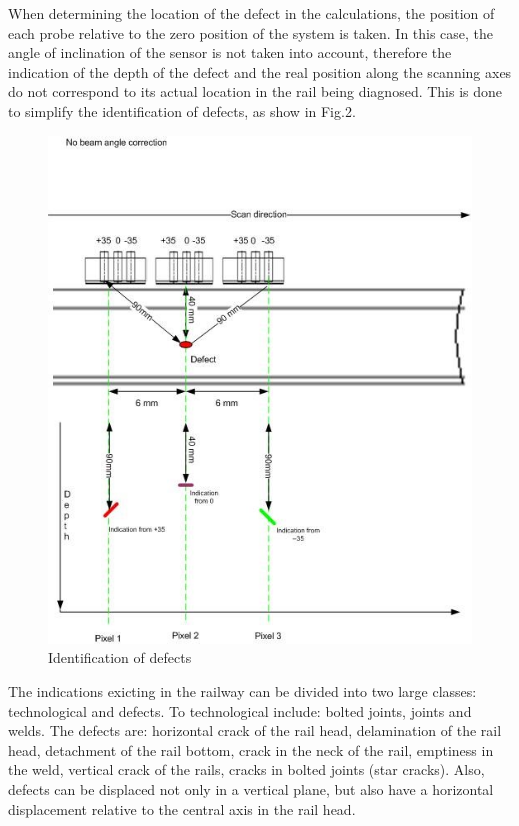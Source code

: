 \documentclass[a4paper, 12pt]{article}
\begin{document}
When determining the location of the defect in the calculations, the position of each probe relative to the zero position of the system is taken. In this case, the angle of inclination of the sensor is not taken into account, therefore the indication of the depth of the defect and the real position along the scanning axes do not correspond to its actual location in the rail being diagnosed. This is done to simplify the identification of defects, as show in Fig.2.

\begin{figure}[h!]
	\includegraphics[width=\textwidth]{fig2}
	\caption{Identification of defects}
\end{figure}

The indications exicting in the railway can be divided into two large classes: technological and defects. To technological include: bolted joints, joints and welds. The defects are: horizontal crack of the rail head, delamination of the rail head, detachment of the rail bottom, crack in the neck of the rail, emptiness in the weld, vertical crack of the rails, cracks in bolted joints (star  cracks). Also, defects can be displaced not only in a vertical plane, but also have a horizontal displacement relative to the central axis in the rail head.
\end{document}
